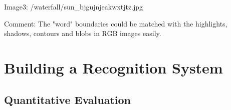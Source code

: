 \documentclass[11pt]{article} \usepackage{fullpage} \usepackage{graphicx} \usepackage{epstopdf} \usepackage{color} \usepackage{psfrag} \usepackage{pdfsync}\usepackage{indentfirst}\usepackage{subfigure}\usepackage{float}\usepackage[section]{placeins}
\begin{document}
\begin{figure}[H]
\centering
{}
\end{figure}

Image3: /waterfall/sun\_bjgujnjeakwxtjtz.jpg

\begin{figure}[H]
\centering
{}
\end{figure}
Comment: The "word" boundaries could be matched with the highlights, shadows, contours and blobs in RGB images easily.

\section{Building a Recognition System}
\setcounter{subsection}{4}
\subsection{Quantitative Evaluation}
\end{document}
